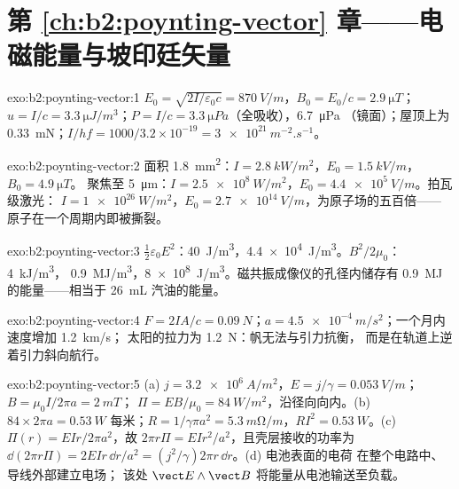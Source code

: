 \section*{第 \ref{ch:b2:poynting-vector} 章——电磁能量与坡印廷矢量}

\begin{solution}{exo:b2:poynting-vector:1}
$E_0 = \sqrt{2I/\varepsilon_0c} = \qty{870}{V/m}$，$B_0 = E_0/c = \qty{2.9}{\micro T}$；$u = I/c
= \qty{3.3}{\micro J/m^3}$；$P = I/c = \qty{3.3}{\micro Pa}$（全吸收），\qty{6.7}{\micro Pa}
（镜面）；屋顶上为 \qty{0.33}{mN}；$I/hf = 1000/3.2 \times 10^{-19} = \qty{3e21}{m^{-2}.s^{-1}}$。
\end{solution}

\begin{solution}{exo:b2:poynting-vector:2}
面积 \qty{1.8}{mm^2}：$I = \qty{2.8}{kW/m^2}$，$E_0 = \qty{1.5}{kV/m}$，$B_0 = \qty{4.9}{\micro T}$。
聚焦至 \qty{5}{\micro m}：$I = \qty{2.5e8}{W/m^2}$，$E_0 = \qty{4.4e5}{V/m}$。拍瓦级激光：
$I = \qty{1e26}{W/m^2}$，$E_0 = \qty{2.7e14}{V/m}$，为原子场的五百倍——
原子在一个周期内即被撕裂。
\end{solution}

\begin{solution}{exo:b2:poynting-vector:3}
$\tfrac12\varepsilon_0E^2$：\qty{40}{J/m^3}，\qty{4.4e4}{J/m^3}。$B^2/2\mu_0$：\qty{4}{kJ/m^3}，
\qty{0.9}{MJ/m^3}，\qty{8e8}{J/m^3}。磁共振成像仪的孔径内储存有 \qty{0.9}{MJ} 的能量——相当于 \qty{26}{mL}
汽油的能量。
\end{solution}

\begin{solution}{exo:b2:poynting-vector:4}
$F = 2IA/c = \qty{0.09}{N}$；$a = \qty{4.5e-4}{m/s^2}$；一个月内速度增加 \qty{1.2}{km/s}；
太阳的拉力为 \qty{1.2}{N}：帆无法与引力抗衡，
而是在轨道上逆着引力斜向航行。
\end{solution}

\begin{solution}{exo:b2:poynting-vector:5}
(a) $j = \qty{3.2e6}{A/m^2}$，$E = j/\gamma = \qty{0.053}{V/m}$；$B = \mu_0I/2\pi a = \qty{2}{mT}$；
$\Pi = EB/\mu_0 = \qty{84}{W/m^2}$，沿径向向内。(b) $84 \times 2\pi a = \qty{0.53}{W}$
每米；$R = 1/\gamma\pi a^2 = \qty{5.3}{m\ohm/m}$，$RI^2 = \qty{0.53}{W}$。(c) $\Pi(r)
= EIr/2\pi a^2$，故 $2\pi r\Pi = EIr^2/a^2$，且壳层接收的功率为 $\dd(2\pi r\Pi)
= 2EIr\,\dd r/a^2 = (j^2/\gamma)2\pi r\,\dd r$。(d) 电池表面的电荷
在整个电路中、导线外部建立电场；
该处 $\vect E\wedge\vect B$ 将能量从电池输送至负载。
\end{solution}

